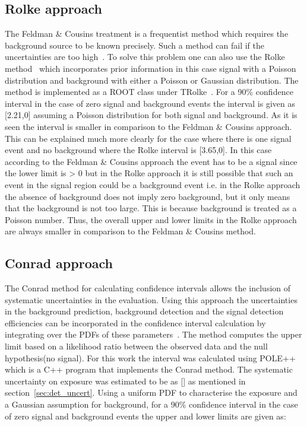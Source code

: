 \subsection{Rolke approach}
\label{subsec:Rolke}
The Feldman \& Cousins treatment is a frequentist method which requires the background source to be known precisely. Such a method can fail if the uncertainties are too high~\cite{Rolke:2000ij}. To solve this problem one can also use the Rolke method~\cite{Rolke:2004mj} which incorporates prior information in this case signal with a Poisson distribution and background with either a Poisson or Gaussian distribution. The method is implemented as a ROOT class under TRolke~\cite{TRolke_ROOT}. For a 90\% confidence interval in the case of zero signal and background events the interval is given as [2.21,0] assuming a Poisson distribution for both signal and background. As it is seen the interval is smaller in comparison to the Feldman \& Cousins approach. This can be explained much more clearly for the case where there is one signal event and no background where the Rolke interval is [3.65,0]. In this case according to the Feldman \& Cousins approach the event has to be a signal since the lower limit is > 0 but in the Rolke approach it is still possible that such an event in the signal region could be a background event i.e. in the Rolke approach the absence of background does not imply zero background, but it only means that the background is not too large. This is because background is treated as a Poisson number. Thus, the overall upper and lower limits in the Rolke approach are always smaller in comparison to the Feldman \& Cousins  method. 

\subsection{Conrad approach}
\label{subsec:Conrad}
The Conrad method for calculating confidence intervals allows the inclusion of systematic uncertainties in the evaluation. Using this approach the uncertainties in the background prediction, background detection and the signal detection efficiencies can be incorporated in the confidence interval calculation by integrating over the PDFs of these parameters~\cite{Conrad:2002kn}. The method computes the upper limit based on a likelihood ratio between the observed data and the null hypothesis(no signal). For this work the interval was calculated using POLE++~\cite{Conrad:2005zm} which is a C++ program that implements the Conrad method. The systematic uncertainty on exposure was estimated to be as [] as mentioned in section~\ref{sec:det_uncert}. Using a uniform PDF to characterise the exposure and a Gaussian assumption for background, for a 90\% confidence interval in the case of zero signal and background events the upper and lower limits are given as: 

